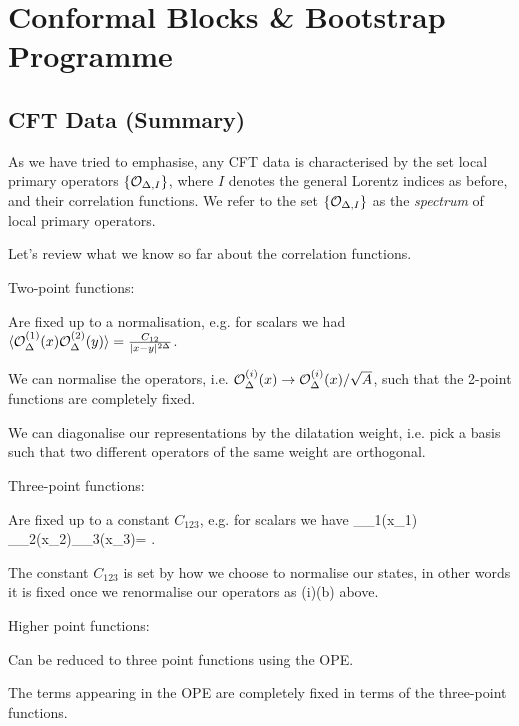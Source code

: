 \chapter{Conformal Blocks \& Bootstrap Programme}

\section{CFT Data (Summary)}

As we have tried to emphasise, any CFT data is characterised by the set local primary operators $\{\mathcal{O}_{\Delta,I}\}$, where $I$ denotes the general Lorentz indices as before, and their correlation functions. We refer to the set $\{\mathcal{O}_{\Delta,I}\}$ as the \textit{spectrum} of local primary operators.

Let's review what we know so far about the correlation functions.
\ben[label=(\roman*)] 
    \item Two-point functions: 
        \ben 
            \item Are fixed up to a normalisation, e.g. for scalars we had $\langle \mathcal{O}^{(1)}_{\Delta}(x)\mathcal{O}^{(2)}_{\Delta}(y)\rangle = \frac{C_{12}}{|x-y|^{2\Delta}}$. 
            \item We can normalise the operators, i.e. $\mathcal{O}^{(i)}_{\Delta}(x) \to \mathcal{O}^{(i)}_{\Delta}(x)/\sqrt{A}$, such that the 2-point functions are completely fixed.
            \item We can diagonalise our representations by the dilatation weight, i.e. pick a basis such that two different operators of the same weight are orthogonal. 
        \een 
    \item Three-point functions:
        \ben 
            \item Are fixed up to a constant $C_{123}$, e.g. for scalars we have 
            \bse
                \la \cO_{\Delta_1}(x_1) \cO_{\Delta_2}(x_2)\cO_{\Delta_3}(x_3)\ra = .
            \ese
            \item The constant $C_{123}$ is set by how we choose to normalise our states, in other words it is fixed once we renormalise our operators as (i)(b) above.
        \een 
    \item Higher point functions: 
        \ben 
            \item Can be reduced to three point functions using the OPE.
            \item The terms appearing in the OPE are completely fixed in terms of the three-point functions. 
        \een 
\een 

